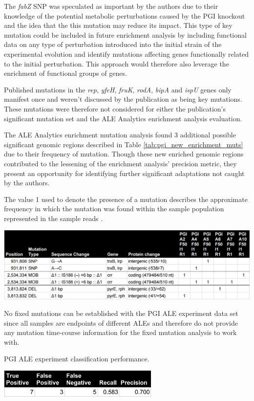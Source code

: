 \documentclass[12pt,final,masters,chapterheads]{ucsd}  %
\begin{document}
The \textit{fabZ} SNP was speculated as important by the authors due to their knowledge of the potential metabolic perturbations caused by the PGI knockout and the idea that the this mutation may reduce its impact. This type of key mutation could be included in future enrichment analysis by including functional data on any type of perturbation introduced into the initial strain of the experimental evolution and identify mutations affecting genes functionally related to the initial perturbation. This approach would therefore also leverage the enrichment of functional groups of genes.

Published mutations in the \textit{rep}, \textit{yfeH}, \textit{fruK}, \textit{rodA}, \textit{bipA} and \textit{ispU} genes only manifest once and weren't discussed by the publication as being key mutations. These mutations were therefore not considered for either the publication's significant mutation set and the ALE Analytics enrichment analysis evaluation.

The ALE Analytics enrichment mutation analysis found 3 additional possible significant genomic regions described in Table \ref{tab:pgi_new_enrichment_muts} due to their frequency of mutation. Though these new enriched genomic regions contributed to the lessening of the enrichment analysis' precision metric, they present an opportunity for identifying further significant adaptations not caught by the authors.
\begin{table}[H]
  \centering
  \caption[New PGI ALE experiment enrichment key mutations found by the automated enrichment analysis.]{ The value 1 used to denote the presence of a mutation describes the approximate frequency in which the mutation was found within the sample population represented in the sample reads \cite{breseq_paper}.}
  \includegraphics[width=\textwidth]{pgi_new_enrichment_muts.png}
  \label{tab:pgi_new_enrichment_muts}
\end{table}
No fixed mutations can be established with the PGI ALE experiment data set since all samples are endpoints of different ALEs and therefore do not provide any mutation time-course information for the fixed mutation analysis to work with.
\begin{table}[H]
  \centering
  \caption{PGI ALE experiment classification performance.}
  \includegraphics[width=0.6\textwidth]{pgi_precision_recall.png}
\end{table}
\end{document}
